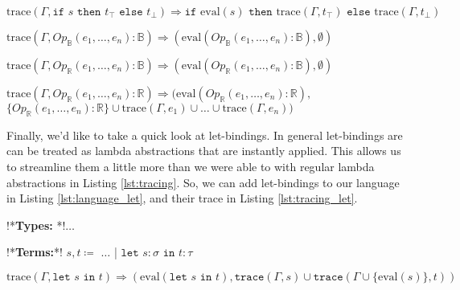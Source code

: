         \begin{quicklst}[caption=Control flow tracing, label=lst:tracing_bool, gobble=12]
            $\text{trace}(\Gamma,\texttt{if }s\texttt{ then }t_\top\texttt{ else }t_\bot)\Rightarrow\texttt{if }\text{eval}(s)\texttt{ then }\text{trace}(\Gamma,t_\top)\texttt{ else }\text{trace}(\Gamma,t_\bot)$

            $\text{trace}(\Gamma,Op_\mathbb{B}(e_1,\dots,e_n):\mathbb{B})\Rightarrow(\text{eval}(Op_\mathbb{B}(e_1,\dots,e_n):\mathbb{B}),\emptyset)$

            $\text{trace}(\Gamma,Op_\mathbb{R}(e_1,\dots,e_n):\mathbb{B})\Rightarrow(\text{eval}(Op_\mathbb{R}(e_1,\dots,e_n):\mathbb{B}),\emptyset)$

            $\text{trace}(\Gamma,Op_\mathbb{R}(e_1,\dots,e_n):\mathbb{R})\Rightarrow(\text{eval}(Op_\mathbb{R}(e_1,\dots,e_n):\mathbb{R}),$
                $\{Op_\mathbb{R}(e_1,\dots,e_n):\mathbb{R}\}\cup\text{trace}(\Gamma,e_1)\cup\dots\cup\text{trace}(\Gamma,e_n))$
        \end{quicklst}

        Finally, we'd like to take a quick look at let-bindings.
        In general let-bindings are can be treated as lambda abstractions that are instantly applied.
        This allows us to streamline them a little more than we were able to with regular lambda abstractions in Listing \ref{lst:tracing}.
        So, we can add let-bindings to our language in Listing \ref{lst:language_let}, and their trace in Listing \ref{lst:tracing_let}.

        \begin{quicklst}[caption=Adding let bindings, label=lst:language_let, gobble=12]
            !*\textbf{Types: }*!$\dots$

            !*\textbf{Terms:}*!
                $s,t\coloneqq$
                    $\dots$
                  | $\texttt{let }s:\sigma\texttt{ in }t:\tau$
        \end{quicklst}

        \begin{quicklst}[caption=Tracing let bindings, label=lst:tracing_let, gobble=12]
            $\text{trace}(\Gamma,\texttt{let }s\texttt{ in }t)\Rightarrow(\text{eval}(\texttt{let }s\texttt{ in }t),\texttt{trace}(\Gamma,s)\cup\texttt{trace}(\Gamma\cup\{\text{eval}(s)\},t))$
        \end{quicklst}


